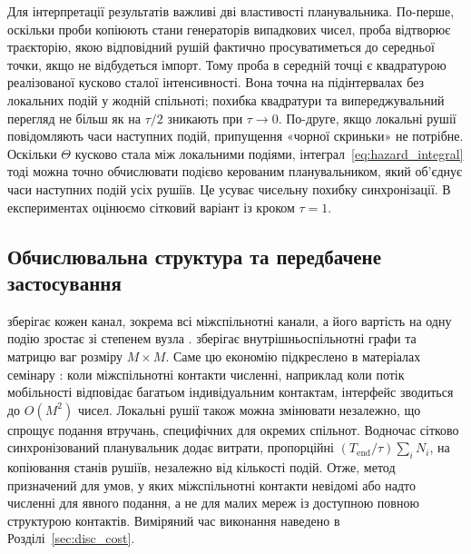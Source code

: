 Для інтерпретації результатів важливі дві властивості планувальника. По-перше, оскільки проби копіюють стани генераторів випадкових чисел, проба відтворює траєкторію, якою відповідний рушій фактично просуватиметься до середньої точки, якщо не відбудеться імпорт. Тому проба в середній точці є квадратурою реалізованої кусково сталої інтенсивності. Вона точна на підінтервалах без локальних подій у жодній спільноті; похибка квадратури та випереджувальний перегляд не більш як на $\tau/2$ зникають при $\tau\to0$. По-друге, якщо локальні рушії повідомляють часи наступних подій, припущення «чорної скриньки» не потрібне. Оскільки $\Theta$ кусково стала між локальними подіями, інтеграл~\eqref{eq:hazard_integral} тоді можна точно обчислювати подієво керованим планувальником, який об'єднує часи наступних подій усіх рушіїв. Це усуває чисельну похибку синхронізації. В експериментах оцінюємо сітковий варіант із кроком $\tau=1$.

\subsection{Обчислювальна структура та передбачене застосування}
\label{sec:cost}

\Full{} зберігає кожен канал, зокрема всі міжспільнотні канали, а його вартість на одну подію зростає зі степенем вузла \citep{kuryliak2025simulating}. \TS{} зберігає внутрішньоспільнотні графи та матрицю ваг розміру $M\times M$. Саме цю економію підкреслено в матеріалах семінару \citep{kuryliak2025towards}: коли міжспільнотні контакти численні, наприклад коли потік мобільності відповідає багатьом індивідуальним контактам, інтерфейс зводиться до $O(M^2)$ чисел. Локальні рушії також можна змінювати незалежно, що спрощує подання втручань, специфічних для окремих спільнот. Водночас сітково синхронізований планувальник додає витрати, пропорційні $(T_{\mathrm{end}}/\tau)\sum_iN_i$, на копіювання станів рушіїв, незалежно від кількості подій. Отже, метод призначений для умов, у яких міжспільнотні контакти невідомі або надто численні для явного подання, а не для малих мереж із доступною повною структурою контактів. Виміряний час виконання наведено в Розділі~\ref{sec:disc_cost}.

